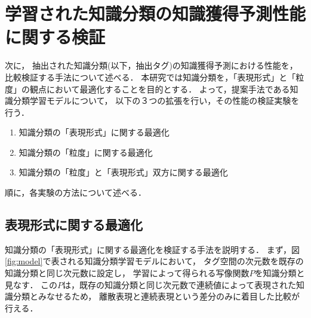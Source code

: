 %
%
%


\section{学習された知識分類の知識獲得予測性能に関する検証}
次に，
抽出された知識分類(以下，抽出タグ)の知識獲得予測における性能を，比較検証する手法について述べる．
本研究では知識分類を，「表現形式」と「粒度」の観点において最適化することを目的とする．
よって，提案手法である知識分類学習モデルについて，
以下の３つの拡張を行い，その性能の検証実験を行う．
\begin{enumerate}
	\item 知識分類の「表現形式」に関する最適化
	\item 知識分類の「粒度」に関する最適化
	\item 知識分類の「粒度」と「表現形式」双方に関する最適化
\end{enumerate}
順に，各実験の方法について述べる．

\subsection{表現形式に関する最適化}
知識分類の「表現形式」に関する最適化を検証する手法を説明する．
まず，図\ref{fig:model}で表される知識分類学習モデルにおいて，
タグ空間の次元数を既存の知識分類と同じ次元数に設定し，
学習によって得られる写像関数$P$を知識分類と見なす．
この$P$は，既存の知識分類と同じ次元数で連続値によって表現された知識分類とみなせるため，
離散表現と連続表現という差分のみに着目した比較が行える．

